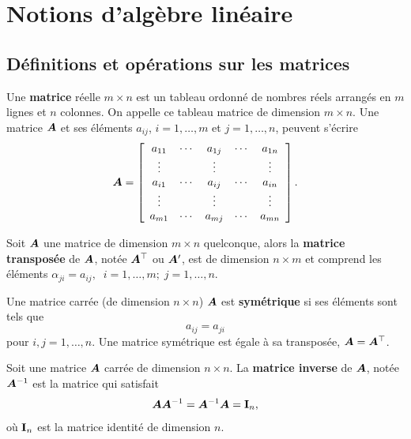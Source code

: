 \section{Notions d'algèbre linéaire}

\subsection{Définitions et opérations sur les matrices}


\begin{defn}
Une \textbf{matrice} réelle $m\times n$ est un tableau ordonné de nombres réels arrangés en $m$ lignes et $n$ colonnes. On appelle ce tableau matrice de dimension $m \times n$. 
Une matrice $\bm{A}$ et ses éléments $a_{ij}$, $i = 1, \dots, m$ et $j=1, \dots, n$, peuvent s'écrire
$$
\bm{A}=\left[ \begin{array}{ccccc}
a_{11} & \cdots & a_{1j} & \cdots & a_{1n} \\
\vdots &         & \vdots &           & \vdots \\
a_{i1} &  \cdots       &  a_{ij} & \cdots & a_{in} \\
\vdots &         & \vdots &           & \vdots \\
a_{m1} &  \cdots & a_{mj}& \cdots & a_{mn}
\end{array}
\right].
$$
\end{defn}

\begin{defn}
Soit $\bm{A}$ une matrice de dimension $m\times n$ quelconque, alors la \textbf{matrice transposée} de $\bm{A}$, notée $\bm{A}^\top$ ou $\bm{A}'$, est de dimension $n\times m$ et comprend les éléments $\alpha_{ji}=a_{ij},\;\;i=1,\ldots,m; \; j=1,\ldots,n.$
\end{defn}

\begin{defn}
    Une matrice carrée (de dimension $n\times n$) $\bm{A}$ est \textbf{symétrique} si ses éléments sont tels que
    $$ a_{ij} = a_{ji}$$
    pour $i, j = 1, \dots, n$. Une matrice symétrique est égale à sa transposée, $\bm{A} = \bm{A}^\top$.
\end{defn}

\begin{defn}
    Soit une matrice $\bm{A}$ carrée de dimension $n\times n$. La \textbf{matrice inverse} de $\bm{A}$, notée $\bm{A}^{-1}$ est la matrice qui satisfait
    $$ \bm{A} \bm{A}^{-1} = \bm{A}^{-1}\bm{A} = \bold{I}_n,$$
    où $\bold{I}_n$ est la matrice identité de dimension $n$.
\end{defn}

